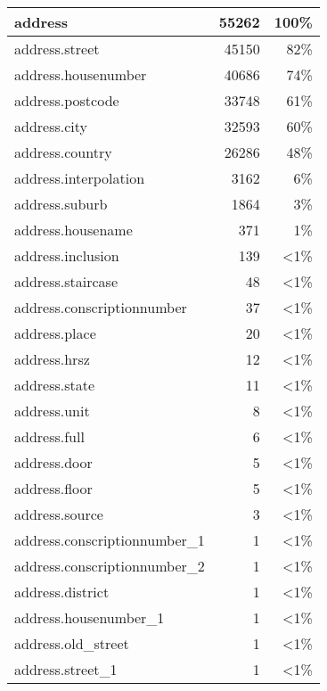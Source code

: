 \documentclass{article}
\begin{document}
\begin{multicols}{2}
\label{table:2}
\begin{tabular}{lrr}
\hline
address                       & 55262 & 100\%          \\
\hline
address.street                & 45150 & 82\%           \\
\hline
address.housenumber           & 40686 & 74\%           \\
\hline
address.postcode              & 33748 & 61\%           \\
\hline
address.city                  & 32593 & 60\%           \\
\hline
address.country               & 26286 & 48\%           \\
\hline
address.interpolation         & 3162  & 6\%            \\
\hline
address.suburb                & 1864  & 3\%            \\
\hline
address.housename             & 371   & 1\%            \\
\hline
address.inclusion             & 139   & \textless 1\%  \\
\hline
address.staircase             & 48    & \textless 1\%  \\
\hline
address.conscriptionnumber    & 37    & \textless 1\%  \\
\hline
address.place                 & 20    & \textless 1\%  \\
\hline
address.hrsz                  & 12    & \textless 1\%  \\
\hline
address.state                 & 11    & \textless 1\%  \\
\hline
address.unit                  & 8     & \textless 1\%  \\
\hline
address.full                  & 6     & \textless 1\%  \\
\hline
address.door                  & 5     & \textless 1\%  \\
\hline
address.floor                 & 5     & \textless 1\%  \\
\hline
address.source                & 3     & \textless 1\%  \\
\hline
address.conscriptionnumber\_1 & 1     & \textless 1\%  \\
\hline
address.conscriptionnumber\_2 & 1     & \textless 1\%  \\
\hline
address.district              & 1     & \textless 1\%  \\
\hline
address.housenumber\_1        & 1     & \textless 1\%  \\
\hline
address.old\_street           & 1     & \textless 1\%  \\
\hline
address.street\_1             & 1     & \textless 1\%  \\
\hline
\end{tabular}


\printbibliography

\end{multicols}
\end{document}
